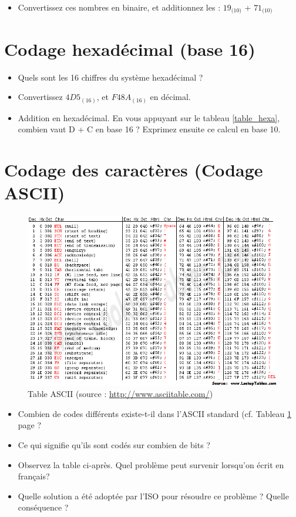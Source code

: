  \begin{itemize}
   \item  Convertissez ces nombres en binaire, et additionnez les : $19_{\text{(10)}}$ + $71_{\text{(10)}}$
 \end{itemize}

\section{Codage hexadécimal (base 16)}
 \begin{itemize}
 \item  Quels sont les 16 chiffres du système hexadécimal ?
 \item  Convertissez $4D5_{(16)}$, et $F48A_{(16)}$ en décimal.
 \item  Addition en hexadécimal. En vous appuyant sur le tableau \ref{table_hexa}, combien vaut D + C en base 16 ? Exprimez ensuite ce calcul en base 10.
 \end{itemize}



\section{Codage des caractères (Codage ASCII)}

\begin{figure}
\caption{Table ASCII (source : \url{http://www.asciitable.com/})\label{tab:ascii}}
\includegraphics[width=1\textwidth]{../images/asciifull.png}
\end{figure}

 \begin{itemize}
 \item  Combien de codes différents existe-t-il dans l'ASCII standard (cf. Tableau \ref{tab:ascii} page \pageref{tab:ascii}?
 \item  Ce qui signifie qu'ils sont codés sur combien de bits ?
 \item  Observez la table ci-après. Quel problème peut survenir lorsqu'on écrit en français?
 \item  Quelle solution a été adoptée par l'ISO pour résoudre ce problème ? Quelle conséquence ?
 \end{itemize}


